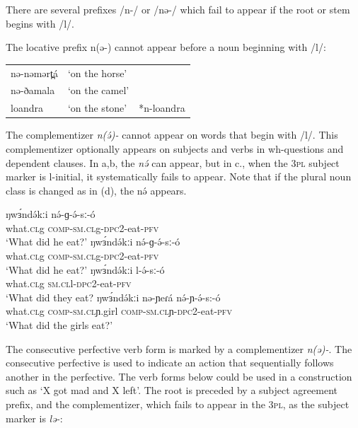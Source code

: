 There are several prefixes /n-/ or /nə-/ which fail to appear if the root or stem begins with /l/.

The locative prefix n(ə-) cannot appear before a noun beginning with /l/:

\ea
\begin{tabular}[t]{lll}
nə-nəmərt̪á	&	‘on the horse’\\
nə-ðamala	&	‘on the camel’\\
loandra		&	‘on the stone’	&	*n-loandra\\
\end{tabular}
\z

The complementizer \textit{n(ə́)-} cannot appear on words that begin with /l/. This complementizer optionally appears on subjects and verbs in wh-questions and dependent clauses. In a,b, the \textit{nə́ }can appear, but in c., when the 3\textsc{pl} subject marker is l-initial, it systematically fails to appear. Note that if the plural noun class is changed as in (d), the nə́ appears. 

\ea
\begin{xlist}
	\ex \gll ŋwɜ́ndə́kːi 	nə́-ɡ-ə́-sː-ó	\\
		what.\textsc{cl}g	\textsc{comp}-\textsc{sm.cl}g-\textsc{dpc}2-eat-\textsc{pfv} \\ 
		\trans ‘What did he eat?’
	\ex \gll ŋwɜ́ndə́kːi 	nə́-ɡ-ə́-sː-ó	\\
		what.\textsc{cl}g	\textsc{comp}-\textsc{sm.cl}g-\textsc{dpc}2-eat-\textsc{pfv}  \\
		\trans ‘What did he eat?’
	\ex	\gll ŋwɜ́ndə́kːi 	l-ə́-sː-ó\\
		what.\textsc{cl}g	\textsc{sm.cl}l-\textsc{dpc}2-eat-\textsc{pfv}  \\
		\trans ‘What did they eat?
	\ex \gll ŋwɜ́ndə́kːi 	nə-ɲeɾá 	nə́-ɲ-ə́-s:-ó\\
		what.\textsc{cl}g	\textsc{comp}-\textsc{sm.cl}ɲ.girl	\textsc{comp}-\textsc{sm.cl}ɲ-\textsc{dpc}2-eat-\textsc{pfv}  \\
		\trans ‘What did the girls eat?’
\end{xlist}
\z

The consecutive perfective verb form is marked by a complementizer \textit{n(ə)-}. The consecutive perfective is used to indicate an action that sequentially follows another in the perfective. The verb forms below could be used in a construction such as ‘X got mad and X left’. The root is preceded by a subject agreement prefix, and the complementizer, which fails to appear in the 3\textsc{pl}, as the subject marker is \textit{lə-}:

